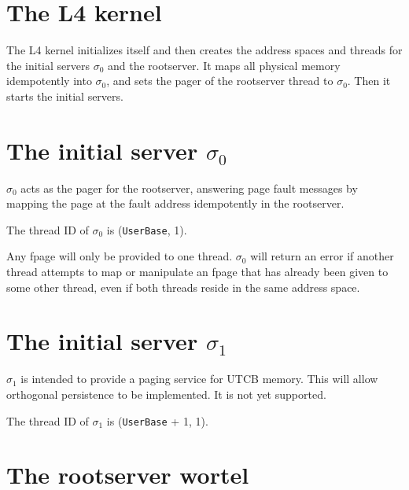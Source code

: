 \section{The L4 kernel}

The L4 kernel initializes itself and then creates the address spaces
and threads for the initial servers $\sigma_0$ and the rootserver.  It
maps all physical memory idempotently into $\sigma_0$, and sets the
pager of the rootserver thread to $\sigma_0$.  Then it starts the
initial servers.


\section{The initial server $\sigma_0$}

$\sigma_0$ acts as the pager for the rootserver, answering page fault
messages by mapping the page at the fault address idempotently in the
rootserver.

\begin{comment}
  $\sigma_0$ can also be used directly by sending messages to it,
  according to the $\sigma_0$ RPC protocol.  This is used by the kernel
  to allocate reserved memory, but can also be used by the user to
  explicitely allocate more memory than single pages indirectly via
  page faults.
\end{comment}

The thread ID of $\sigma_0$ is (\verb/UserBase/, 1).

\begin{comment}
  We will write all thread IDs in the form (\verb/thread nr/,
  \verb/version/).
\end{comment}

Any fpage will only be provided to one thread.  $\sigma_0$ will return
an error if another thread attempts to map or manipulate an fpage that
has already been given to some other thread, even if both threads
reside in the same address space.


\section{The initial server $\sigma_1$}

$\sigma_1$ is intended to provide a paging service for UTCB memory.
This will allow orthogonal persistence to be implemented.  It is not
yet supported.

The thread ID of $\sigma_1$ is (\verb/UserBase/ + 1, 1).


\section{The rootserver wortel}
\label{rootserver}
\label{wortel}

